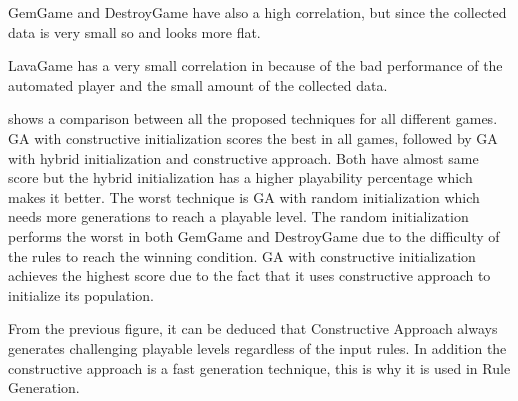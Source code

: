 

GemGame and DestroyGame have also a high correlation, but since the collected data is very small so  and  looks more flat.



LavaGame has a very small correlation in  because of the bad performance of the automated player and the small amount of the collected data.


 shows a comparison between all the proposed techniques for all different games. GA with constructive initialization scores the best in all games, followed by GA with hybrid initialization and constructive approach. Both have almost same score but the hybrid initialization has a higher playability percentage which makes it better. The worst technique is GA with random initialization which needs more generations to reach a playable level. The random initialization performs the worst in both GemGame and DestroyGame due to the difficulty of the rules to reach the winning condition. GA with constructive initialization achieves the highest score due to the fact that it uses constructive approach to initialize its population.


From the previous figure, it can be deduced that Constructive Approach always generates challenging playable levels regardless of the input rules. In addition the constructive approach is a fast generation technique, this is why it is used in Rule Generation.

